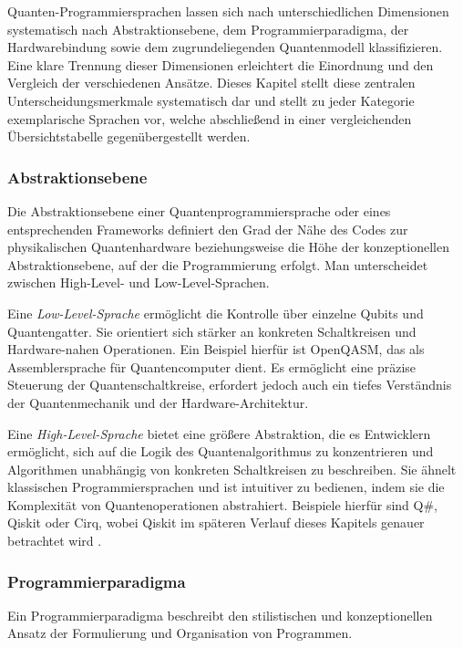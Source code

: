 Quanten-Programmiersprachen lassen sich nach unterschiedlichen Dimensionen systematisch nach Abstraktionsebene, dem Programmierparadigma, der Hardwarebindung sowie dem zugrundeliegenden Quantenmodell klassifizieren. Eine klare Trennung dieser Dimensionen erleichtert die Einordnung und den Vergleich der verschiedenen Ansätze. Dieses Kapitel stellt diese zentralen Unterscheidungsmerkmale systematisch dar und stellt zu jeder Kategorie exemplarische Sprachen vor, welche abschließend in einer vergleichenden Übersichtstabelle gegenübergestellt werden.

\subsubsection*{Abstraktionsebene}

Die Abstraktionsebene einer Quantenprogrammiersprache oder eines entsprechenden Frameworks definiert den Grad der Nähe des Codes zur physikalischen Quantenhardware beziehungsweise die Höhe der konzeptionellen Abstraktionsebene, auf der die Programmierung erfolgt. Man unterscheidet zwischen High-Level- und Low-Level-Sprachen.

Eine \textit{Low-Level-Sprache} ermöglicht die Kontrolle über einzelne Qubits und Quantengatter. Sie orientiert sich stärker an konkreten Schaltkreisen und Hardware-nahen Operationen. Ein Beispiel hierfür ist OpenQASM, das als Assemblersprache für Quantencomputer dient. Es ermöglicht eine präzise Steuerung der Quantenschaltkreise, erfordert jedoch auch ein tiefes Verständnis der Quantenmechanik und der Hardware-Architektur. \autocite{cross_open_2017}

Eine \textit{High-Level-Sprache} bietet eine größere Abstraktion, die es Entwicklern ermöglicht, sich auf die Logik des Quantenalgorithmus zu konzentrieren und Algorithmen unabhängig von konkreten Schaltkreisen zu beschreiben. Sie ähnelt klassischen Programmiersprachen und ist intuitiver zu bedienen, indem sie die Komplexität von Quantenoperationen abstrahiert. Beispiele hierfür sind Q\#, Qiskit oder Cirq, wobei Qiskit im späteren Verlauf dieses Kapitels genauer betrachtet wird \autocite{singhSurveyAvailableTools2024a}.

\subsubsection*{Programmierparadigma}

Ein Programmierparadigma beschreibt den stilistischen und konzeptionellen Ansatz der Formulierung und Organisation von Programmen.

